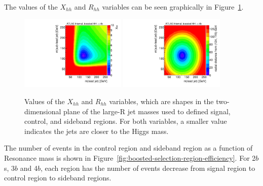 The values of the $X_{hh}$ and $R_{hh}$ variables can be seen graphically in Figure~\ref{fig:boosted-regiondef-cartoons}.
\begin{figure}[htbp!]
\begin{center}
  \includegraphics[width=0.45\textwidth,angle=-90]{figures/boosted/Other/cartoon-xhh.pdf}
  \includegraphics[width=0.45\textwidth,angle=-90]{figures/boosted/Other/cartoon-rhh.pdf}
  \caption{Values of the $X_{hh}$ and $R_{hh}$ variables, which are shapes in the two-dimensional plane of the large-R jet masses used to defined signal, control, and sideband regions. For both variables, a smaller value indicates the jets are closer to the Higgs mass. }
  \label{fig:boosted-regiondef-cartoons}
\end{center}
\end{figure}

The number of events in the control region and sideband region as a function of Resonance mass is shown in Figure~\ref{fig:boosted-selection-region-efficiency}. For 2$b$s, 3$b$ and 4$b$, each region has the number of events decrease from signal region to control region to sideband regions.

